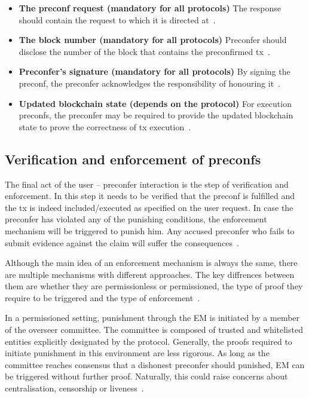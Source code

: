 \documentclass[conference]{IEEEtran}
\theoremstyle{boldstyle}
\begin{document}
    \begin{itemize}
        \item \textbf{The preconf request (mandatory for all protocols)} The response should contain the request to which it is directed at~\cite{W:Towardsanimplementationofbasedpreconfirmationsleveragingrestaking}.
        \item \textbf{The block number (mandatory for all protocols)} Preconfer should disclose the number of the block that contains the preconfirmed tx~\cite{W:PreconfirmationsforVanillaBasedRollups}.
        \item \textbf{Preconfer's signature (mandatory for all protocols)} By signing the preconf, the preconfer acknowledges the responsibility of honouring it~\cite{W:Towardsanimplementationofbasedpreconfirmationsleveragingrestaking}. 
        \item \textbf{Updated blockchain state (depends on the protocol)} For execution preconfs, the preconfer may be required to provide the updated blockchain state to prove the correctness of tx execution~\cite{W:AnalyzingBFTProposer-PromisedPreconfirmations}.
    \end{itemize}
    
    
    \subsection{Verification and enforcement of preconfs}
    The final act of the user -- preconfer interaction is the step of verification and enforcement. In this step it needs to be verified that the preconf is fulfilled and the tx is indeed included/executed as specified on the user request. In case the preconfer has violated any of the punishing conditions, the enforcement mechanism will be triggered to punish him. Any accused preconfer who fails to submit evidence against the claim will suffer the consequences~\cite{W:AnalyzingBFTProposer-PromisedPreconfirmations}.

    Although the main idea of an enforcement mechanism is always the same, there are multiple mechanisms with different approaches. The key diffrences between them are whether they are permissionless or permissioned, the type of proof they require to be triggered and the type of enforcement~\cite{W:PreconfirmationFairExchange}.

    In a permissioned setting, punishment through the EM is initiated by a member of the overseer committee. The committee is composed of trusted and whitelisted entities explicitly designated by the protocol. Generally, the proofs required to initiate punishment in this environment are less rigorous.  As long as the committee reaches consensus that a dishonest preconfer should punished, EM can be triggered without further proof. Naturally, this could raise concerns about centralisation, censorship or liveness~\cite{W:PreconfirmationFairExchange}.
\end{document}
